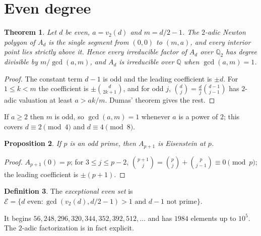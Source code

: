 \documentclass[11pt]{amsart}
\newtheorem{theorem}{Theorem}[section]\newtheorem{proposition}[theorem]{Proposition}\newtheorem{lemma}[theorem]{Lemma}
\theoremstyle{definition}\newtheorem{definition}[theorem]{Definition}\newtheorem{example}[theorem]{Example}
\theoremstyle{remark}\newtheorem{remark}[theorem]{Remark}
\newcommand{\Q}{\mathbb Q}\newcommand{\Z}{\mathbb Z}\newcommand{\F}{\mathbb F}
\begin{document}
\section{Even degree}\label{sec:even}
\begin{theorem}\label{thm:even}
Let $d$ be even, $a=v_2(d)$ and $m=d/2-1$. The $2$-adic Newton polygon of $A_d$ is the single segment from $(0,0)$ to $(m,a)$, and every
interior point lies strictly above it. Hence every irreducible factor of $A_d$ over $\Q_2$ has degree divisible by $m/\gcd(a,m)$, and $A_d$ is
irreducible over $\Q$ when $\gcd(a,m)=1$.
\end{theorem}
\begin{proof}
The constant term $d-1$ is odd and the leading coefficient is $\pm d$. For $1\le k<m$ the coefficient is $\pm\binom d{2k+1}$, and for odd $j$,
$\binom dj=\frac dj\binom{d-1}{j-1}$ has $2$-adic valuation at least $a>ak/m$. Dumas' theorem \cite{Dumas} gives the rest.
\end{proof}
If $a\ge2$ then $m$ is odd, so $\gcd(a,m)=1$ whenever $a$ is a power of $2$; this covers $d\equiv2\pmod4$ and $d\equiv4\pmod8$.

\begin{proposition}\label{prop:eis}
If $p$ is an odd prime, then $A_{p+1}$ is Eisenstein at $p$.
\end{proposition}
\begin{proof}
$A_{p+1}(0)=p$; for $3\le j\le p-2$, $\binom{p+1}j=\binom pj+\binom p{j-1}\equiv0\pmod p$; the leading coefficient is $\pm(p+1)$.
\end{proof}

\begin{definition}
The \emph{exceptional even set} is $\mathcal E=\{d \text{ even}: \gcd(v_2(d),d/2-1)>1 \text{ and } d-1\text{ not prime}\}$.
\end{definition}
It begins $56,248,296,320,344,352,392,512,\dots$ and has $1984$ elements up to $10^5$. The $2$-adic factorization is in fact explicit.
\end{document}
